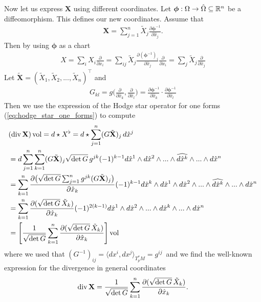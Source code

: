\documentclass[../master_thesis.tex]{subfiles}
\begin{document}
Now let us express $\mathbf{X}$ using different coordinates. 
Let $\bm{\phi}: \Omega \rightarrow \hat{\Omega} \subseteq \mathbb{R}^n$ be a diffeomorphism. 
This defines our new coordinates. 
Assume that 
\begin{align*}
    \mathbf{X} = \sum_{j=1}^n \tilde{X}_j 
    \frac{\partial \bm{\phi}^{-1}}{\partial \hat{x}_j}.
\end{align*}
Then by using $\bm{\phi}$ as a chart
\begin{align*}
    X = \sum_i X_i \frac{\partial}{\partial x_i}
        = \sum_{ij} \tilde{X}_j \frac{\partial (\bm{\phi}^{-1})_i}{\partial \hat{x}_j} \frac{\partial}{\partial x_i}
        = \sum_{j} \tilde{X}_j \frac{\partial}{\partial \hat{x}_j}
\end{align*}
Let $\tilde{\mathbf{X}} = (\tilde{X}_1, \tilde{X}_2, ..., \tilde{X}_n)^\top$ 
and 
\begin{align*}
    G_{kl} = g\Big(\frac{\partial}{\partial \hat{x}_k}, \frac{\partial}{\partial \hat{x}_l}\Big)
        = \frac{\partial \bm{\phi}^{-1}}{\partial \hat{x}_k} \cdot 
            \frac{\partial \bm{\phi}^{-1}}{\partial \hat{x}_l}
\end{align*}
Then we use the expression of the Hodge star operator 
for one forms (\ref{eq:hodge_star_one_forms}) to compute
\begin{align*}
    &(\operatorname{div} \mathbf{X}) \operatorname{vol} 
    = d \star X^\flat 
    = d \star \sum_{j=1}^n (G \tilde{\mathbf{X}})_j \,d\hat{x}^j 
    \\ &= d \sum_{j=1}^n \sum_{k=1}^n (G \tilde{\mathbf{X}})_j 
        \sqrt{ \det G}\, g^{jk} (-1)^{k-1} d\hat{x}^1 \wedge d\hat{x}^2 \wedge ... \wedge 
        \widehat{d\hat{x}^k} \wedge ... \wedge d\hat{x}^n 
    \\ &= \sum_{k=1}^n \frac{\partial
        \big(\sqrt{ \det G} \sum_{j=1}^n g^{jk} (G \tilde{\mathbf{X}})_j \big)}
        {\partial \hat{x}_k} (-1)^{k-1} d\hat{x}^k \wedge d\hat{x}^1 \wedge d\hat{x}^2 \wedge ... \wedge 
        \widehat{d\hat{x}^k} \wedge ... \wedge d\hat{x}^n 
    \\ &= \sum_{k=1}^n \frac{\partial (\sqrt{ \det G}\,  \tilde{X}_k) }
        {\partial \hat{x}_k} (-1)^{2(k-1)} d\hat{x}^1 \wedge d\hat{x}^2 \wedge ... \wedge 
        d\hat{x}^k \wedge ... \wedge d\hat{x}^n
    \\ &= \left[ \frac{1}{\sqrt{ \det G}} \sum_{k=1}^n 
        \frac{\partial (\sqrt{ \det G}\,  \tilde{X}_k) }{\partial \hat{x}_k}
        \right] \operatorname{vol}
\end{align*}
where we used that $(G^{-1})_{ij} = \langle dx^i, dx^j \rangle_{T^*_p M} = g^{ij}$\
and we find the well-known expression for the divergence in general coordinates
\begin{align*}
    \operatorname{div} \mathbf{X} = \frac{1}{\sqrt{ \det G}} \sum_{k=1}^n 
        \frac{\partial (\sqrt{ \det G} \, \tilde{X}_k )}{\partial \hat{x}_k}.
\end{align*}
\end{document}
